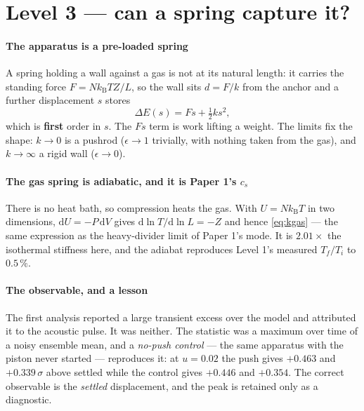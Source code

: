 \documentclass[journal]{IEEEtran}
\newcommand{\kT}{k_{\mathrm B}T}
\newcommand{\dd}{\mathrm{d}}
\begin{document}
\section{Level 3 --- can a spring capture it?}\label{sec:l3}
\paragraph{The apparatus is a pre-loaded spring} A spring holding a wall against a gas is not at its
natural length: it carries the standing force $F = N\kT Z/L$, so the wall sits $d = F/k$ from the
anchor and a further displacement $s$ stores
\begin{equation}
\Delta E(s) = F s + \tfrac12 k s^2 ,
\label{eq:preload}
\end{equation}
which is \textbf{first} order in $s$. The $Fs$ term is work lifting a weight. The limits fix the
shape: $k \to 0$ is a pushrod ($\epsilon \to 1$ trivially, with nothing taken from the gas), and
$k \to \infty$ a rigid wall ($\epsilon \to 0$).

\paragraph{The gas spring is adiabatic, and it is Paper 1's $c_s$} There is no heat bath, so
compression heats the gas. With $U = N\kT$ in two dimensions, $\dd U = -P\,\dd V$ gives
$\dd\ln T/\dd\ln L = -Z$ and hence \eqref{eq:kgas} --- the same expression as the heavy-divider
limit of Paper 1's mode. It is $2.01\times$ the isothermal stiffness here, and the adiabat
reproduces Level 1's measured $T_f/T_i$ to $0.5\,\%$.

\paragraph{The observable, and a lesson} The first analysis reported a large transient excess over
the model and attributed it to the acoustic pulse. It was neither. The statistic was a maximum over
time of a noisy ensemble mean, and a \emph{no-push control} --- the same apparatus with the piston
never started --- reproduces it: at $u = 0.02$ the push gives $+0.463$ and $+0.339\,\sigma$ above
settled while the control gives $+0.446$ and $+0.354$. The correct observable is the \emph{settled}
displacement, and the peak is retained only as a diagnostic.
\end{document}

